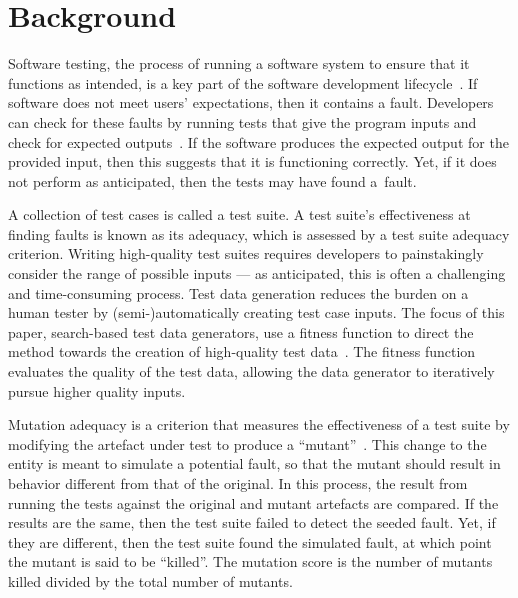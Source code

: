 \section{Background}\label{sec:background}


Software testing, the process of running a software system to ensure that it functions as intended, is a key part of
the software development lifecycle~\cite{ammann2008}. If software does not meet users' expectations, then it contains a
fault.  Developers can check for these faults by running tests that give the program inputs and check for expected
outputs~\cite{ammann2008}.  If the software produces the expected output for the provided input, then this suggests that
it is functioning correctly.  Yet, if it does not perform as anticipated, then the tests may have found \mbox{a fault}.


A collection of test cases is called a test suite. A test suite's effectiveness at finding faults is known as its
adequacy, which is assessed by a test suite adequacy criterion.  Writing high-quality test suites requires developers to
painstakingly consider the range of possible inputs --- as anticipated, this is often a challenging and time-consuming
process. Test data generation reduces the burden on a human tester by (semi-)automatically creating test case inputs.
The focus of this paper, search-based test data generators, use a fitness function to direct the method towards the
creation of high-quality test data~\cite{STVR:STVR294}. The fitness function evaluates the quality of the test data,
allowing the data generator to iteratively pursue higher quality inputs.


Mutation adequacy is a criterion that measures the effectiveness of a test suite by modifying the artefact under test to
produce a ``mutant''~\cite{Just2011a}. This change to the entity is meant to simulate a potential fault, so that the
mutant should result in behavior different from that of the original. In this process, the result from running the tests
against the original and mutant artefacts are compared. If the results are the same, then the test suite failed to
detect the seeded fault.  Yet, if they are different, then the test suite found the simulated fault, at which point the
mutant is said to be ``killed''.  The mutation score is the number of mutants killed divided by the total number of
mutants.

